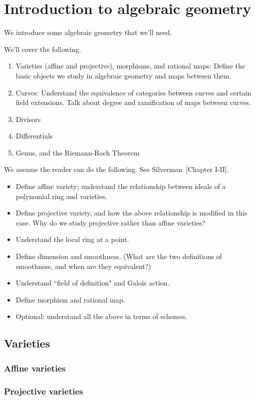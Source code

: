 \chapter{Introduction to algebraic geometry}
We introduce some algebraic geometry that we'll need.

We'll cover the following.
\begin{enumerate}
\item
Varieties (affine and projective), morphisms, and rational maps: Define the basic objects we study in algebraic geometry and maps between them.
\item
Curves: Understand the equivalence of categories between curves and certain field extensions. Talk about degree and ramification of maps between curves.
\item
Divisors
\item Differentials
\item Genus, and the Riemann-Roch Theorem
\end{enumerate}

We assume the reader can do the following. See Silverman~\cite{Si86}[Chapter I-II].
\begin{itemize}
\item
Define affine variety; understand the relationship between ideals of a polynomial ring and varieties.
\item Define projective variety, and how the above relationship is modified in this case. Why do we study projective rather than affine varieties?
\item Understand the local ring at a point.
\item Define dimension and smoothness. (What are the two definitions of smoothness, and when are they equivalent?)
\item Understand ``field of definition" and Galois action.
\item Define morphism and rational map.
\item Optional: understand all the above in terms of schemes.
\end{itemize}

\section{Varieties}
\subsection{Affine varieties}
\subsection{Projective varieties}
